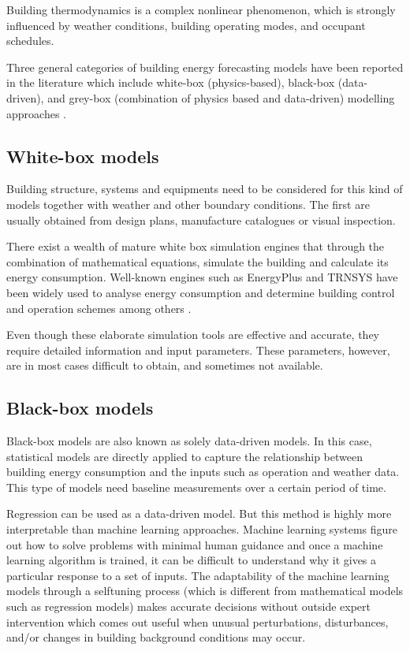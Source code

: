\documentclass[10pt, conference, compsocconf]{IEEEtran}
\begin{document}
Building thermodynamics is a complex nonlinear phenomenon, which is strongly influenced by weather conditions, building operating modes, and occupant schedules.

Three general categories of building energy forecasting models have been reported in the literature which include white-box (physics-based), black-box (data-driven), and grey-box (combination of physics based and data-driven) modelling approaches \cite{li2014review}.

\subsection{White-box models}


Building structure, systems and equipments need to be considered for this kind of models together with weather and other boundary conditions. The first are usually obtained from design plans, manufacture catalogues or visual inspection.

There exist a wealth of mature white box simulation engines that through the combination of mathematical equations, simulate the building and calculate its energy consumption. Well-known engines such as EnergyPlus \cite{crawley2001energyplus} and TRNSYS \cite{TRNSYS} have been widely used to analyse energy consumption and determine building control and operation schemes among others \cite{crawley2008contrasting}.

Even though these elaborate simulation tools are effective and accurate, they require detailed information and input parameters. These parameters, however, are in most cases difficult to obtain, and sometimes not available.

\subsection{Black-box models}


Black-box models are also known as solely data-driven models. In this case, statistical models are directly applied to capture the relationship between building energy consumption and the inputs such as operation and weather data. This type of models need baseline measurements over a certain period of time.

Regression can be used as a data-driven model. But this method is highly more interpretable than machine learning approaches. 
Machine learning systems figure out how to solve problems with minimal human guidance and once a machine learning algorithm is trained, it can be difficult to understand why it gives a particular response to a set of inputs. The adaptability of the machine learning models through a selftuning process (which is different from mathematical models such as regression models) makes accurate decisions without outside expert intervention which comes out useful when unusual perturbations, disturbances, and/or changes in building background conditions may occur.
\end{document}
